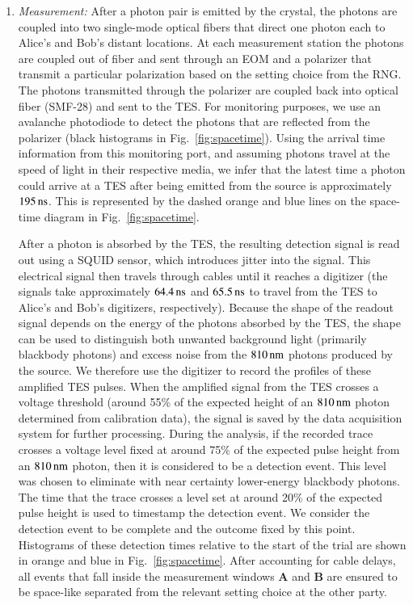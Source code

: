 \documentclass[superscriptaddress,twocolumn]{revtex4-1}
\begin{document}
\begin{enumerate}
	
	\item \emph{Measurement:} After a photon pair is emitted by the crystal, the photons are coupled into two single-mode optical fibers that direct one photon each to Alice’s and Bob’s distant locations. At each measurement station the photons are coupled out of fiber and sent through an EOM and a polarizer that transmit a particular polarization based on the setting choice from the RNG. The photons transmitted through the polarizer are coupled back into optical fiber (SMF-28) and sent to the TES. For monitoring purposes, we use an avalanche photodiode to detect the photons that are reflected from the polarizer (black histograms in Fig.~\ref{fig:spacetime}). Using the arrival time information from this monitoring port, and assuming photons travel at the speed of light in their respective media, we infer that the latest time a photon could arrive at a TES after being emitted from the source is approximately $\unit[195]{ns}$. This is represented by the dashed orange and blue lines on the space-time diagram in Fig.~\ref{fig:spacetime}. 

After a photon is absorbed by the TES, the resulting detection signal is read out using a  SQUID sensor, which introduces jitter into the signal. This electrical signal then travels through cables until it reaches a digitizer (the signals take approximately $\unit[64.4]{ns}$ and $\unit[65.5]{ns}$ to travel from the TES to Alice’s and Bob’s digitizers, respectively). Because the shape of the readout signal depends on the energy of the photons absorbed by the TES, the shape can be used to distinguish both unwanted background light (primarily blackbody photons) and excess noise from the $\unit[810]{nm}$ photons produced by the source.  We therefore use the digitizer to record the profiles of these amplified TES pulses.  When the amplified signal from the TES crosses a voltage threshold (around 55\% of the expected height of an $\unit[810]{nm}$ photon determined from calibration data), the signal is saved by the data acquisition system for further processing. During the analysis, if the recorded trace crosses a voltage level fixed at around 75\% of the expected pulse height from an $\unit[810]{nm}$ photon, then it is considered to be a detection event. This level was chosen to eliminate with near certainty lower-energy blackbody photons. The time that the trace crosses a level set at around 20\% of the expected pulse height is used to timestamp the detection event. We consider the detection event to be complete and the outcome fixed by this point. Histograms of these detection times relative to the start of the trial are shown in orange and blue in Fig.~\ref{fig:spacetime}. After accounting for cable delays, all events that fall inside the measurement windows \textbf{A} and \textbf{B} are ensured to be space-like separated from the relevant setting choice at the other party.
	

	
\end{enumerate}
\end{document}
